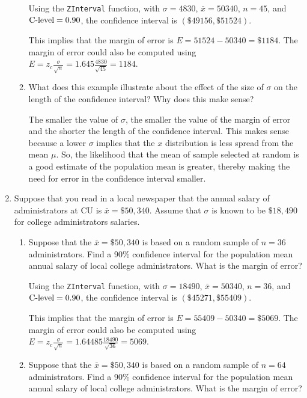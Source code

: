 \documentclass{article}
\newcommand{\answer}[1]{\color{red}#1}
\begin{document}
\begin{enumerate}
\begin{enumerate}
	{\answer Using the \texttt{ZInterval} function, with $\sigma = 4830$, $\bar{x} = 50340$, $n=45$, and $\textnormal{C-level} = 0.90$, the confidence interval is $(\$49156, \$51524)$. 
	
	This implies that the margin of error is $E = 51524 - 50340 = \$1184$. 
	The margin of error could also be computed using $\displaystyle E = z_c\frac{\sigma}{\sqrt{n}} = 1.645\frac{4830}{\sqrt{45}} = 1184$.
	} 

	\item What does this example illustrate about the effect of the size of $\sigma$ on the length of the confidence interval? Why does this make sense? 
	
	{\answer The smaller the value of $\sigma$, the smaller the value of the margin of error and the shorter the length of the confidence interval.  This makes sense because a lower $\sigma$ implies that the $x$ distribution is less spread from the mean $\mu$. So, the likelihood that the mean of sample selected at random is a good estimate of the population mean is greater, thereby making the need for error in the confidence interval smaller.
	} 
	\end{enumerate}

\vfill
\pagebreak
	
\item Suppose that you read in a local newspaper that the annual salary of administrators at CU is $\bar x = \$50,340$. Assume that $\sigma$ is known to be $\$18,490$ for college administrators salaries. 

	\begin{enumerate}
	\item Suppose that the $\bar x = \$50,340$ is based on a random sample of $n=36$ administrators. Find a 90\% confidence interval for the population mean annual salary of local college administrators. What is the margin of error? 
	
	{\answer Using the \texttt{ZInterval} function, with $\sigma = 18490$, $\bar{x} = 50340$, $n=36$, and $\textnormal{C-level} = 0.90$, the confidence interval is $(\$45271, \$55409)$. 
	
	This implies that the margin of error is $E = 55409 - 50340 = \$5069$. 
	The margin of error could also be computed using $\displaystyle E = z_c\frac{\sigma}{\sqrt{n}} = 1.64485\frac{18490}{\sqrt{36}} = 5069$.
	} 

	\item Suppose that the $\bar x = \$50,340$ is based on a random sample of $n=64$ administrators. Find a 90\% confidence interval for the population mean annual salary of local college administrators. What is the margin of error? 
	

\end{enumerate}
\end{enumerate}
\end{document}
